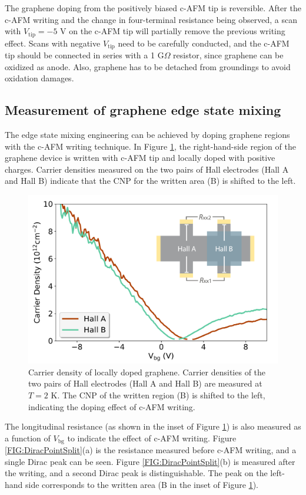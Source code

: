 \documentclass[pdflatex, sectionletters, 12pt]{pittetd}    %
\begin{document}
The graphene doping from the positively biased c-AFM tip is reversible. After the c-AFM writing and the change in four-terminal resistance being observed, a scan with $V_\mathrm{tip}= -5$ V on the c-AFM tip will partially remove the previous writing effect. Scans with negative $V_\mathrm{tip}$ need to be carefully conducted, and the c-AFM tip should be connected in series with a 1 G$\Omega$ resistor, since graphene can be oxidized as anode\cite{alaboson2011conductive, byun2011nanoscale}. Also, graphene has to be detached from groundings to avoid oxidation damages\cite{alaboson2011conductive}. 

\subsection{Measurement of graphene edge state mixing}

The edge state mixing engineering can be achieved by doping graphene regions with the c-AFM writing technique. In Figure \ref{FIG:GrapheneDopedHall}, the right-hand-side region of the graphene device is written with c-AFM tip and locally doped with positive charges. Carrier densities measured on the two pairs of Hall electrodes (Hall A and Hall B) indicate that the CNP for the written area (B) is shifted to the left.
\\

\begin{figure}[h!]
	\centering
	\includegraphics[width=.7\textwidth]{Drawing/GrapheneDopedHall.pdf}
	\caption{Carrier density of locally doped graphene. Carrier densities of the two pairs of Hall electrodes (Hall A and Hall B) are measured at $T = 2$ K. The CNP of the written region (B) is shifted to the left, indicating the doping effect of c-AFM writing.}
	\label{FIG:GrapheneDopedHall}	
\end{figure}

The longitudinal resistance (as shown in the inset of Figure \ref{FIG:GrapheneDopedHall}) is also measured as a function of $V_\mathrm{bg}$ to indicate the effect of c-AFM writing. Figure \ref{FIG:DiracPointSplit}(a) is the resistance measured before c-AFM writing, and a single Dirac peak can be seen. Figure \ref{FIG:DiracPointSplit}(b) is measured after the writing, and a second Dirac peak is distinguishable. The peak on the left-hand side corresponds to the written area (B in the inset of Figure \ref{FIG:GrapheneDopedHall}).
\\
\end{document}
